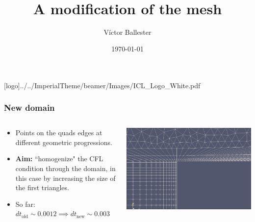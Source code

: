 \documentclass[
	aspectratio=169, %
	t, %
	onlytextwidth, %
	10pt, %
]{beamer}
\title{A modification of the mesh} %
\subtitle{} %
\author{Víctor Ballester} %
\date{\today} %
\def\imagefolder{../../ImperialTheme/beamer/Images}
\begin{document}
\begingroup
{} %
[logo]{\imagefolder/ICL_Logo_White.pdf} %
\frame[plain, s]{\titlepage} %
\endgroup

\begin{frame}
	\frametitle{New domain}
	\begin{columns}[T] %
	\begin{column}{0.38\linewidth} %
		\begin{itemize}
			\item Points on the quads edges at different geometric progressions.
			\item \textbf{Aim:} ``homogenize" the CFL condition through the domain, in this case by increasing the size of the first triangles.
			\item So far: $dt_\text{old} \sim 0.0012\implies dt_\text{new} \sim 0.003$
		\end{itemize}
	\end{column}
	\begin{column}{0.58\linewidth} %
		{
			\centering
			\includegraphics[width=\linewidth]{Images/zoomeddomain.png}
		}
	\end{column}
	\end{columns}
	
        
\end{frame}
\end{document}
